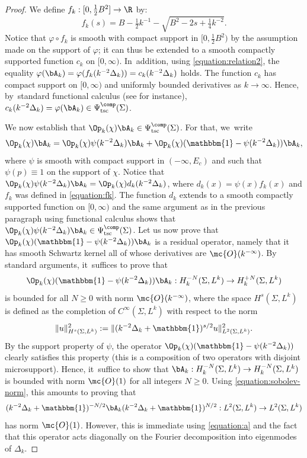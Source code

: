 \begin{proof}
We define $f_k : [0,\tfrac{1}{2}B^2] \to \R$ by:
\begin{equation}
\label{equation:fk}
f_k(s) = B-\tfrac{1}{2}k^{-1}-\sqrt{B^2-2s+\tfrac{1}{4}k^{-2}}.
\end{equation}
Notice that $\varphi \circ f_k$ is smooth with compact support in $[0,\tfrac{1}{2}B^2)$ by the assumption made on the support of $\varphi$; it can thus be extended to a smooth compactly supported function $c_k$ on $[0,\infty)$. In~addition, using \eqref{equation:relation2}, the equality $\varphi(\bA_k) =\varphi(f_k(k^{-2}\Delta_k)) = c_k(k^{-2}\Delta_k)$ holds. The function $c_k$ has compact support on $[0,\infty)$ and uniformly bounded derivatives as $k \to \infty$. Hence, by~standard functional calculus (see \cite[Th.\,14.9]{Zworski-12} for instance), $c_k(k^{-2}\Delta_k) = \varphi(\bA_k) \in \Psi^{\comp}_{\mathrm{tsc}}(\Sigma)$.

We now establish that $\Op_k(\chi) \bA_k \in \Psi^{\comp}_{\mathrm{tsc}}(\Sigma)$. For that, we~write
\[
\Op_k(\chi) \bA_k =\Op_k(\chi) \psi(k^{-2}\Delta_k) \bA_k + \Op_k(\chi) (\mathbbm{1}-\psi(k^{-2}\Delta_k)) \bA_k,
\]
where $\psi $ is smooth with compact support in $(-\infty, E_c)$ and such that $\psi(p) \equiv 1$ on the support of $\chi$. Notice that $\Op_k(\chi) \psi(k^{-2}\Delta_k) \bA_k = \Op_k(\chi) d_k(k^{-2}\Delta_k)$, where $d_k(x) = \psi(x) f_k(x)$ and $f_k$ was defined in \eqref{equation:fk}. The function $d_k$ extends to a smooth compactly supported function on $[0,\infty)$ and the same argument as in the previous paragraph using functional calculus shows that $\Op_k(\chi) \psi(k^{-2}\Delta_k) \bA_k \in \Psi^{\comp}_{\mathrm{tsc}}(\Sigma)$. Let us now prove that $\Op_k(\chi) (\mathbbm{1}-\psi(k^{-2}\Delta_k)) \bA_k$ is a residual operator, namely that it has smooth Schwartz kernel all of whose derivatives are $\mc{O}(k^{-\infty})$. By standard arguments, it~suffices to prove that
\[
\Op_k(\chi) (\mathbbm{1}-\psi(k^{-2}\Delta_k)) \bA_k : H^{-N}_k(\Sigma,L^k) \to H^{+N}_k(\Sigma,L^k)
\]
is bounded for all $N \geq 0$ with norm $\mc{O}(k^{-\infty})$, where the space $H^s(\Sigma,L^k)$ is defined as the completion of $C^\infty(\Sigma,L^k)$ with respect to the norm
\begin{equation}
\label{equation:sobolev-norm}
\|u\|^2_{H^s(\Sigma,L^k)} := \|(k^{-2}\Delta_k+\mathbbm{1})^{s/2} u\|^2_{L^2(\Sigma,L^k)}.
\end{equation}
By the support property of $\psi$, the operator $\Op_k(\chi) (\mathbbm{1}-\psi(k^{-2}\Delta_k))$ clearly satisfies this property (this is a composition of two operators with disjoint microsupport). Hence, it~suffice to show that $\bA_k : H^{-N}_k(\Sigma,L^k) \to H^{-N}_k(\Sigma,L^k)$ is bounded with norm $\mc{O}(1)$ {\color{black}for all integers $N \geq 0$}. Using \eqref{equation:sobolev-norm}, this amounts to proving that
\[
(k^{-2}\Delta_k+\mathbbm{1})^{-N/2} \bA_k (k^{-2}\Delta_k+\mathbbm{1})^{N/2} : L^2(\Sigma,L^k) \to L^2(\Sigma,L^k)
\]
has norm $\mc{O}(1)$. However, this is immediate using \eqref{equation:a} and
the fact that this operator acts diagonally on the Fourier decomposition into eigenmodes of $\Delta_k$.


\end{proof}
